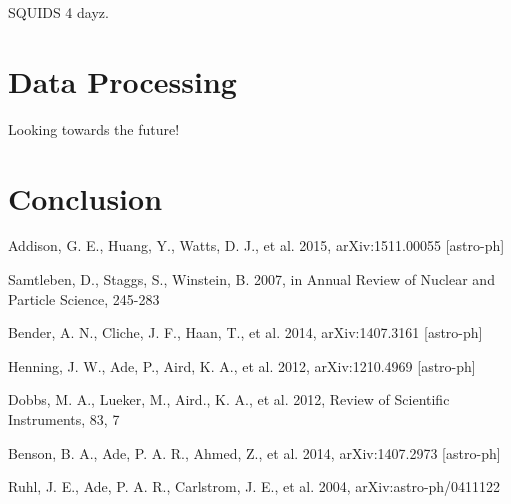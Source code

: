 \documentclass[iop]{emulateapj}
\begin{document}
SQUIDS 4 dayz.

\section{Data Processing}
\label{data_section}

Looking towards the future!


\section{Conclusion}

%
\begin{thebibliography}{dummy}
Addison, G. E., Huang, Y., Watts, D. J., et al. 2015, {arXiv:1511.00055 [astro-ph]}

Samtleben, D., Staggs, S., Winstein, B. 2007, in Annual Review of Nuclear and Particle Science, 245-283

Bender, A. N., Cliche, J. F., Haan, T., et al. 2014, {arXiv:1407.3161 [astro-ph]}

Henning, J. W., Ade, P., Aird, K. A., et al. 2012, {arXiv:1210.4969 [astro-ph]}

Dobbs, M. A., Lueker, M., Aird., K. A., et al. 2012, Review of Scientific Instruments, 83, 7

Benson, B. A., Ade, P. A. R., Ahmed, Z., et al. 2014, {arXiv:1407.2973 [astro-ph]}

Ruhl, J. E., Ade, P. A. R., Carlstrom, J. E., et al. 2004, {arXiv:astro-ph/0411122}

\end{thebibliography}
\end{document}
